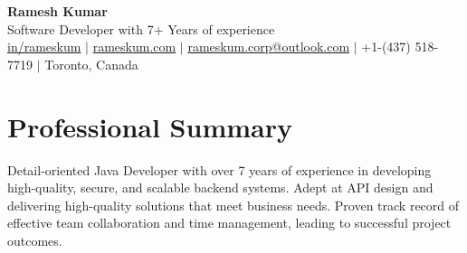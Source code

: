 \documentclass[a4paper, 10pt]{article}
\begin{document}
\begin{center}
  \textbf{\huge Ramesh Kumar} \\
  \vspace{2pt}
  Software Developer with 7+ Years of experience\\
  \vspace{2pt}
  \href{https:\\linkedin.com/in/rameskum}{\small \faLinkedin \hspace{2pt} in/rameskum}
  $\vert$
  \href{https:\\rameskum.com}{\small \faChain \hspace{1pt} rameskum.com}
  $\vert$
  \href{mailto:rameskum.corp@outlook.com}{\small \faEnvelope \hspace{2pt} rameskum.corp@outlook.com}
  $\vert$
  \faPhone \hspace{1pt} \small{ +1-(437) 518-7719}
  $\vert$
  \small \faMapMarker \hspace{2pt} \small{Toronto, Canada}\\
\end{center}

\small
\section{Professional Summary}



Detail-oriented Java Developer with over 7 years of experience in developing high-quality, secure, and scalable backend systems. Adept at API design and delivering high-quality solutions that meet business needs. Proven track record of effective team collaboration and time management, leading to successful project outcomes.
\end{document}
